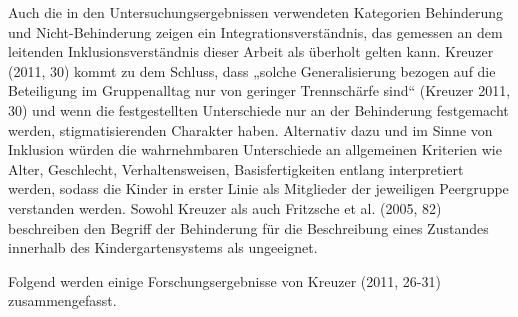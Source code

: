 Auch die in den Untersuchungsergebnissen verwendeten Kategorien Behinderung und Nicht-Behinderung zeigen ein Integrationsverständnis, das gemessen an dem leitenden Inklusionsverständnis dieser Arbeit als überholt gelten kann. Kreuzer (2011, 30) kommt zu dem Schluss, dass „solche Generalisierung bezogen auf die Beteiligung im Gruppenalltag nur von geringer Trennschärfe sind“ (Kreuzer 2011, 30) und wenn die festgestellten Unterschiede nur an der Behinderung festgemacht werden, stigmatisierenden Charakter haben. Alternativ dazu und im Sinne von Inklusion würden die wahrnehmbaren Unterschiede an allgemeinen Kriterien wie Alter, Geschlecht, Verhaltensweisen, Basisfertigkeiten entlang interpretiert werden, sodass die Kinder in erster Linie als Mitglieder der jeweiligen Peergruppe verstanden werden. Sowohl Kreuzer als auch Fritzsche et al. (2005, 82) beschreiben den Begriff der Behinderung für die Beschreibung eines Zustandes innerhalb des Kindergartensystems als ungeeignet. 

Folgend werden einige Forschungsergebnisse von Kreuzer (2011, 26-31) zusammengefasst.

